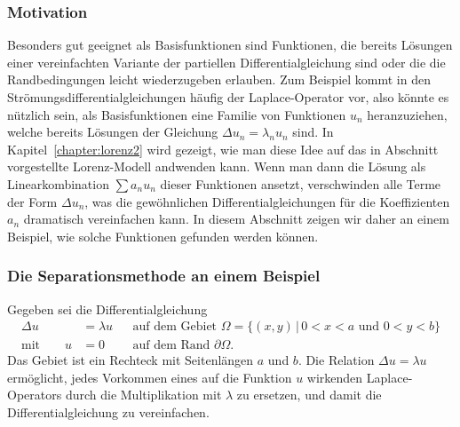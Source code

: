\subsubsection{Motivation}
Besonders gut geeignet als Basisfunktionen sind Funktionen, die bereits
Lösungen einer vereinfachten Variante der partiellen Differentialgleichung
sind oder die die Randbedingungen leicht wiederzugeben erlauben.
Zum Beispiel kommt in den Strömungsdifferentialgleichungen häufig der
Laplace-Operator vor, also könnte es nützlich sein, als Basisfunktionen
eine Familie von Funktionen $u_n$ heranzuziehen, welche bereits Lösungen
der Gleichung $\Delta u_n=\lambda_nu_n$ sind.
In Kapitel~\ref{chapter:lorenz2} wird
gezeigt, wie man diese Idee auf das in
Abschnitt~\label{section:lorenz-modell} vorgestellte Lorenz-Modell
andwenden kann.
Wenn man dann die Lösung als Linearkombination $\sum a_nu_n$ dieser Funktionen
ansetzt, verschwinden alle Terme der Form $\Delta u_n$, was die gewöhnlichen
Differentialgleichungen für die Koeffizienten $a_n$ dramatisch vereinfachen
kann.
In diesem Abschnitt zeigen wir daher an einem Beispiel, wie solche Funktionen
gefunden werden können. 

\subsubsection{Die Separationsmethode an einem Beispiel}
Gegeben sei die Differentialgleichung
\[
\begin{aligned}
\Delta u &= \lambda u&&
\text{auf dem Gebiet $\Omega=\{ (x,y)\,|\, 0<x<a\text{ und }0<y<b\}$}
\\
\text{mit}
\qquad
u&=0&&\text{auf dem Rand $\partial\Omega$.}
\end{aligned}
\]
Das Gebiet ist ein Rechteck mit Seitenlängen $a$ und $b$.
Die Relation $\Delta u=\lambda u$ ermöglicht, jedes Vorkommen eines auf
die Funktion $u$ wirkenden Laplace-Operators durch die Multiplikation
mit $\lambda$ zu ersetzen, und damit die Differentialgleichung zu vereinfachen.

